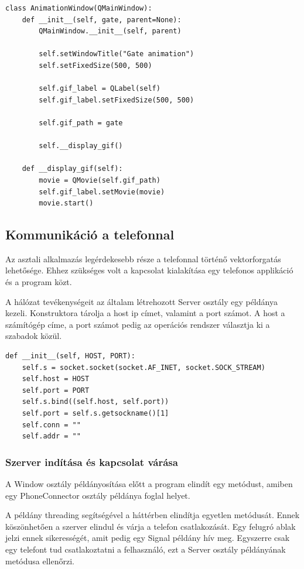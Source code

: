 \documentclass[
]{thesis-ekf}
\theoremstyle{definition}
\theoremstyle{remark}
\begin{document}
\begin{lstlisting}[caption={AnimationWindow osztály}]
class AnimationWindow(QMainWindow):
	def __init__(self, gate, parent=None):
		QMainWindow.__init__(self, parent)
		
		self.setWindowTitle("Gate animation")
		self.setFixedSize(500, 500)
		
		self.gif_label = QLabel(self)
		self.gif_label.setFixedSize(500, 500)
		
		self.gif_path = gate
		
		self.__display_gif()

	def __display_gif(self):
		movie = QMovie(self.gif_path)
		self.gif_label.setMovie(movie)
		movie.start()
\end{lstlisting}

\subsection{Kommunikáció a telefonnal}
Az asztali alkalmazás legérdekesebb része a telefonnal történő vektorforgatás lehetősége. Ehhez szükséges volt a kapcsolat kialakítása egy telefonos applikáció és a program közt.

A hálózat tevékenységeit az általam létrehozott Server osztály egy példánya kezeli. Konstruktora tárolja a host ip címet, valamint a port számot. A host a számítógép címe, a port számot pedig az operációs rendszer választja ki a szabadok közül.

\begin{lstlisting}[caption={A Server osztály konstruktora}]
def __init__(self, HOST, PORT):
	self.s = socket.socket(socket.AF_INET, socket.SOCK_STREAM)
	self.host = HOST
	self.port = PORT
	self.s.bind((self.host, self.port))
	self.port = self.s.getsockname()[1]
	self.conn = ""
	self.addr = ""
\end{lstlisting}

\subsubsection{Szerver indítása és kapcsolat várása}
A Window osztály példányosítása előtt a program elindít egy metódust, amiben egy PhoneConnector osztály példánya foglal helyet. 

A példány threading segítségével a háttérben elindítja egyetlen metódusát. Ennek köszönhetően a szerver elindul és várja a telefon csatlakozását. Egy felugró ablak jelzi ennek sikerességét, amit pedig egy Signal példány hív meg. Egyszerre csak egy telefont tud csatlakoztatni a felhasználó, ezt a Server osztály példányának metódusa ellenőrzi.
\end{document}
